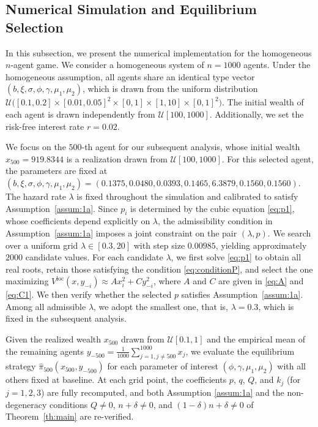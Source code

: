 \documentclass[11pt]{article}
\newenvironment{bluepar}
{\begingroup\color{blue}}
{\endgroup}
\numberwithin{equation}{section}
\providecommand{\smn}{{-}} %
\begin{document}
\begin{bluepar}	
\subsection{Numerical Simulation and Equilibrium Selection}\label{sub:NS}

In this subsection, we present the numerical implementation for the homogeneous \(n\)-agent game. We consider a homogeneous system of $n = 1000$ agents. Under the homogeneous assumption, all agents share an identical type vector $( b, \xi, \sigma, \phi, \gamma, \mu_1, \mu_2)$, which is drawn from the uniform distribution \(\mathcal{U}\big([0.1,0.2]\times[0.01,0.05]^2\times[0,1]\times[1,10]\times[0,1]^2\big)\). The initial wealth of each agent is drawn independently from $\mathcal{U}[100,1000]$. Additionally, we set the risk-free interest rate $r=0.02$.

 We focus on the $500$-th agent for our subsequent analysis, whose initial wealth $x_{500} = 919.8344$  is a realization drawn from \(\mathcal{U}[100,1000]\). For this selected agent, the parameters are fixed at $(b, \xi, \sigma, \phi,\gamma, \mu_1, \mu_2) = (0.1375, 0.0480, 0.0393, 0.1465, 6.3879, 0.1560, 0.1560)$. The hazard rate $\lambda$ is fixed throughout the simulation
and calibrated to satisfy Assumption~\ref{assum:1a}. Since $p_i$ is determined by the cubic equation \eqref{eq:p1}, whose coefficients depend explicitly on $\lambda$, the admissibility condition in  Assumption~\ref{assum:1a} imposes a joint constraint on the pair $(\lambda, p)$. We search over a uniform grid $\lambda \in [0.3, 20]$ with step size $0.00985$, yielding approximately $2000$ candidate values. For each candidate
$\lambda$, we first solve \eqref{eq:p1} to obtain all real roots, retain those satisfying the condition \eqref{eq:conditionP}, and select the one maximizing $V^{\mathrm{loc}}(x,y_{\smn i}) \approx A x_i^2 + Cy_{\smn i}^2$, where $A$ and $C$ are given in \eqref{eq:A} and \eqref{eq:C1}. We then verify whether the selected \(p\) satisfies Assumption~\ref{assum:1a}. Among all admissible $\lambda$, we adopt the smallest one, that is, $\lambda=0.3$, which is fixed in the subsequent analysis.
	
	
Given the realized wealth $x_{500}$ drawn from $\mathcal{U}[0.1,1]$ and the empirical mean of the remaining agents
$y_{\smn 500}=\frac{1}{1000}\sum_{j=1,j\neq 500}^{1000}x_j$, we evaluate the equilibrium strategy $\widehat{\pi}_{500}(x_{500}, y_{\smn 500})$ for each parameter of interest $(\phi, \gamma, \mu_1, \mu_2)$ with all others fixed at baseline.  At each grid point, the coefficients \(p\), \(q\), \(Q\), and \(k_j\) (for \(j=1,2,3\)) are fully recomputed,  and both Assumption \ref{assum:1a} and the non-degeneracy conditions $Q \neq 0$, $n+ \delta \neq 0$, and \((1-\delta)n+\delta\neq 0\) of Theorem~\ref{th:main}  are  re-verified.


\end{bluepar}
\end{document}
